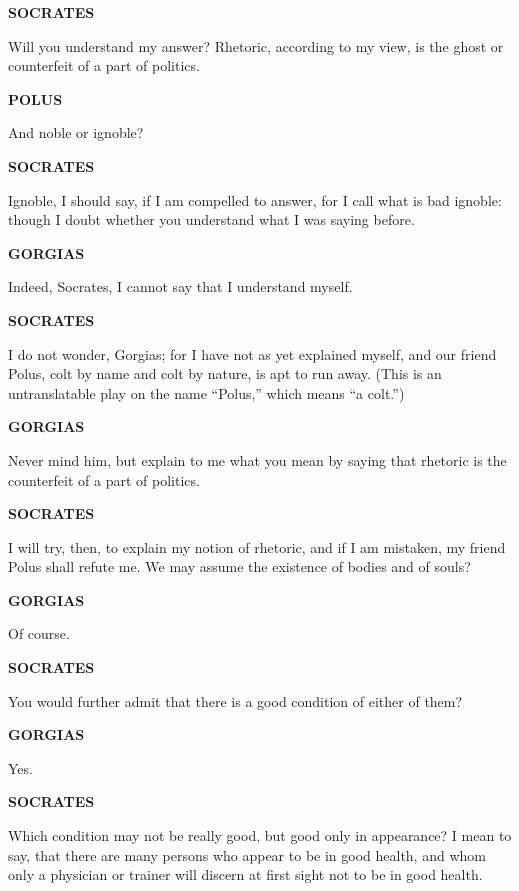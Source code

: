 \documentclass[11pt,letter]{article}
\begin{document}
\par \textbf{SOCRATES}
\par   Will you understand my answer? Rhetoric, according to my view, is the ghost or counterfeit of a part of politics.

\par \textbf{POLUS}
\par   And noble or ignoble?

\par \textbf{SOCRATES}
\par   Ignoble, I should say, if I am compelled to answer, for I call what is bad ignoble:  though I doubt whether you understand what I was saying before.

\par \textbf{GORGIAS}
\par   Indeed, Socrates, I cannot say that I understand myself.

\par \textbf{SOCRATES}
\par   I do not wonder, Gorgias; for I have not as yet explained myself, and our friend Polus, colt by name and colt by nature, is apt to run away. (This is an untranslatable play on the name “Polus,” which means “a colt.”)

\par \textbf{GORGIAS}
\par   Never mind him, but explain to me what you mean by saying that rhetoric is the counterfeit of a part of politics.

\par \textbf{SOCRATES}
\par   I will try, then, to explain my notion of rhetoric, and if I am mistaken, my friend Polus shall refute me. We may assume the existence of bodies and of souls?

\par \textbf{GORGIAS}
\par   Of course.

\par \textbf{SOCRATES}
\par   You would further admit that there is a good condition of either of them?

\par \textbf{GORGIAS}
\par   Yes.

\par \textbf{SOCRATES}
\par   Which condition may not be really good, but good only in appearance? I mean to say, that there are many persons who appear to be in good health, and whom only a physician or trainer will discern at first sight not to be in good health.
\end{document}
